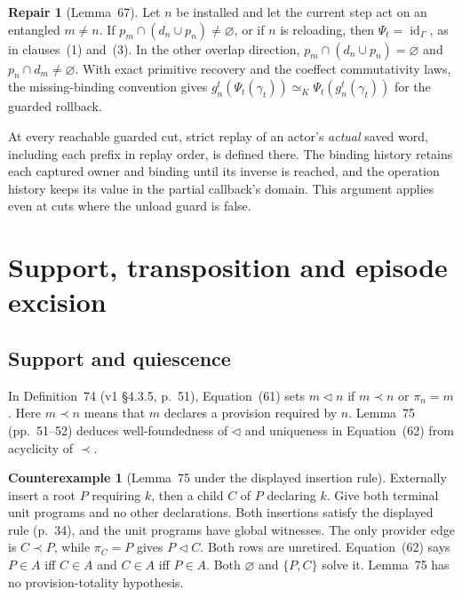 \documentclass[11pt,a4paper]{article}
\theoremstyle{definition}
\newtheorem{counterexample}[definition]{Counterexample}
\newtheorem{repair}[definition]{Repair}
\theoremstyle{plain}
\newcommand{\id}{\operatorname{id}}
\begin{document}
\begin{repair}[Lemma~67]
Let $n$ be installed and let the current step act on an entangled $m\ne n$. If $p_m\cap(d_n\cup p_n)\ne\varnothing$, or if $n$ is reloading, then $\Psi_t=\id_\Gamma$, as in clauses~(1) and~(3). In the other overlap direction, $p_m\cap(d_n\cup p_n)=\varnothing$ and $p_n\cap d_m\ne\varnothing$. With exact primitive recovery and the coeffect commutativity laws, the missing-binding convention gives $g_n^t(\Psi_t(\gamma_t))\simeq_K\Psi_t(g_n^t(\gamma_t))$ for the guarded rollback.

At every reachable guarded cut, strict replay of an actor's \emph{actual} saved word, including each prefix in replay order, is defined there. The binding history retains each captured owner and binding until its inverse is reached, and the operation history keeps its value in the partial callback's domain. This argument applies even at cuts where the unload guard is false.
\end{repair}

\section{Support, transposition and episode excision}
\label{sec:support-excision}

\subsection{Support and quiescence}
\label{sec:support}

In Definition~74 (v1 \S4.3.5, p.~51), Equation~(61) sets $m\triangleleft n$ if $m\prec n$ or $\pi_n=m$. Here $m\prec n$ means that $m$ declares a provision required by $n$. Lemma~75 (pp.~51--52) deduces well-foundedness of $\triangleleft$ and uniqueness in Equation~(62) from acyclicity of $\prec$.

\begin{counterexample}[Lemma~75 under the displayed insertion rule]
Externally insert a root $P$ requiring $k$, then a child $C$ of $P$ declaring $k$. Give both terminal unit programs and no other declarations. Both insertions satisfy the displayed rule (p.~34), and the unit programs have global witnesses. The only provider edge is $C\prec P$, while $\pi_C=P$ gives $P\triangleleft C$. Both rows are unretired. Equation~(62) says $P\in A$ iff $C\in A$ and $C\in A$ iff $P\in A$. Both $\varnothing$ and $\{P,C\}$ solve it. Lemma~75 has no provision-totality hypothesis.
\end{counterexample}
\end{document}
